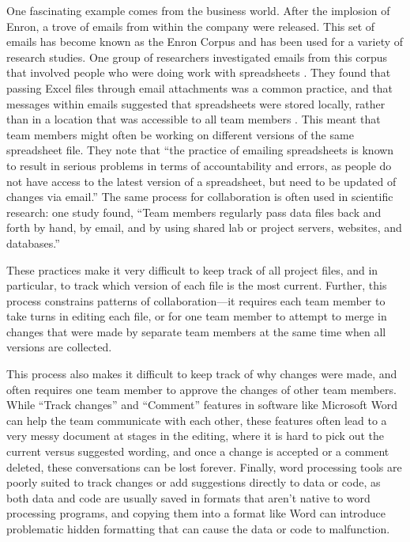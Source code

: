 \documentclass[]{tufte-book}
\begin{document}
One fascinating example comes from the business world. After the implosion of
Enron, a trove of emails from within the company were released. This set of
emails has become known as the Enron Corpus and has been used for a variety of
research studies. One group of researchers investigated emails from this corpus
that involved people who were doing work with spreadsheets \citep{hermans2015enron}.
They found that passing Excel files through email attachments was a common
practice, and that messages within emails suggested that spreadsheets were
stored locally, rather than in a location that was accessible to all team
members \citep{hermans2015enron}. This meant that team members might often be
working on different versions of the same spreadsheet file. They note that ``the
practice of emailing spreadsheets is known to result in serious problems in
terms of accountability and errors, as people do not have access to the latest
version of a spreadsheet, but need to be updated of changes via email.''
\citep{hermans2015enron} The same process for collaboration is often used in
scientific research: one study found, ``Team members regularly pass data files
back and forth by hand, by email, and by using shared lab or project servers,
websites, and databases.'' \citep{edwards2011science}

These practices make it very difficult to keep track of all project files, and
in particular, to track which version of each file is the most current. Further,
this process constrains patterns of collaboration---it requires each team member
to take turns in editing each file, or for one team member to attempt to merge
in changes that were made by separate team members at the same time when all
versions are collected.

This process also makes it difficult to keep track of why changes were made, and
often requires one team member to approve the changes of other team members.
While ``Track changes'' and ``Comment'' features in software like Microsoft Word can
help the team communicate with each other, these features often lead to a very
messy document at stages in the editing, where it is hard to pick out the
current versus suggested wording, and once a change is accepted or a comment
deleted, these conversations can be lost forever. Finally, word processing tools
are poorly suited to track changes or add suggestions directly to data or code,
as both data and code are usually saved in formats that aren't native to word
processing programs, and copying them into a format like Word can introduce
problematic hidden formatting that can cause the data or code to malfunction.
\end{document}
